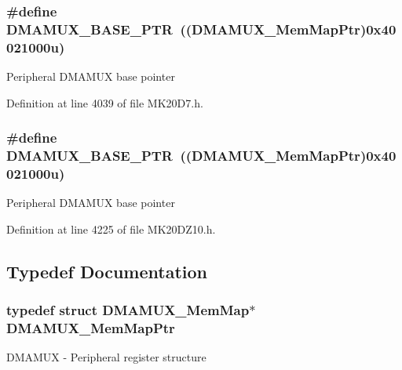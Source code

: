 \subsubsection[{\texorpdfstring{D\+M\+A\+M\+U\+X\+\_\+\+B\+A\+S\+E\+\_\+\+P\+TR}{DMAMUX_BASE_PTR}}]{\setlength{\rightskip}{0pt plus 5cm}\#define D\+M\+A\+M\+U\+X\+\_\+\+B\+A\+S\+E\+\_\+\+P\+TR~(({\bf D\+M\+A\+M\+U\+X\+\_\+\+Mem\+Map\+Ptr})0x40021000u)}\hypertarget{group___d_m_a_m_u_x___peripheral_gad38c261e5de04658dbad762d40e8904e}{}\label{group___d_m_a_m_u_x___peripheral_gad38c261e5de04658dbad762d40e8904e}
Peripheral D\+M\+A\+M\+UX base pointer 

Definition at line 4039 of file M\+K20\+D7.\+h.

\subsubsection[{\texorpdfstring{D\+M\+A\+M\+U\+X\+\_\+\+B\+A\+S\+E\+\_\+\+P\+TR}{DMAMUX_BASE_PTR}}]{\setlength{\rightskip}{0pt plus 5cm}\#define D\+M\+A\+M\+U\+X\+\_\+\+B\+A\+S\+E\+\_\+\+P\+TR~(({\bf D\+M\+A\+M\+U\+X\+\_\+\+Mem\+Map\+Ptr})0x40021000u)}\hypertarget{group___d_m_a_m_u_x___peripheral_gad38c261e5de04658dbad762d40e8904e}{}\label{group___d_m_a_m_u_x___peripheral_gad38c261e5de04658dbad762d40e8904e}
Peripheral D\+M\+A\+M\+UX base pointer 

Definition at line 4225 of file M\+K20\+D\+Z10.\+h.



\subsection{Typedef Documentation}
\subsubsection[{\texorpdfstring{D\+M\+A\+M\+U\+X\+\_\+\+Mem\+Map\+Ptr}{DMAMUX_MemMapPtr}}]{\setlength{\rightskip}{0pt plus 5cm}typedef struct {\bf D\+M\+A\+M\+U\+X\+\_\+\+Mem\+Map}$\ast$ {\bf D\+M\+A\+M\+U\+X\+\_\+\+Mem\+Map\+Ptr}}\hypertarget{group___d_m_a_m_u_x___peripheral_ga736ab5b1ed284b3b4fdb63010a576777}{}\label{group___d_m_a_m_u_x___peripheral_ga736ab5b1ed284b3b4fdb63010a576777}
D\+M\+A\+M\+UX -\/ Peripheral register structure 
